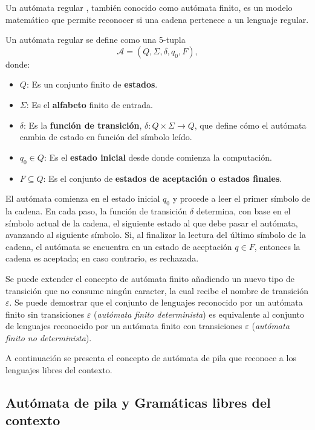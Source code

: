\documentclass[12pt]{article}
\begin{document}
Un autómata regular \cite{authomataTheory}, también conocido como autómata finito, es un modelo matemático que 
permite reconocer si una cadena pertenece a un lenguaje regular. 

Un autómata regular se define como una 5-tupla $$\mathcal{A} = (Q, \Sigma, \delta, q_0, F),$$ donde:

\begin{itemize}
      \item $Q$: Es un conjunto finito de \textbf{estados}.
      \item $\Sigma$: Es el \textbf{alfabeto} finito de entrada.
      \item $\delta$: Es la \textbf{función de transición}, $\delta: Q \times \Sigma \to Q$, que define cómo el autómata cambia de estado en función del símbolo leído.
      \item $q_0 \in Q$: Es el \textbf{estado inicial} desde donde comienza la computación.
      \item $F \subseteq Q$: Es el conjunto de \textbf{estados de aceptación o estados finales}.
\end{itemize}

El autómata comienza en el estado inicial $q_0$ y procede a leer el primer símbolo de la cadena.
En cada paso, la función de transición $\delta$ determina, con base en el símbolo actual de la cadena, el siguiente estado al que debe pasar el autómata, avanzando al siguiente símbolo.
Si, al finalizar la lectura del último símbolo de la cadena, el autómata se encuentra en un estado de aceptación $q \in F$, entonces la cadena es aceptada; en caso contrario, es rechazada.

Se puede extender el concepto de autómata finito añadiendo un nuevo tipo de transición que no consume ningún caracter, la cual recibe el nombre de transición $\varepsilon$. Se puede demostrar \cite{authomataTheory} que el conjunto de lenguajes reconocido por un autómata finito sin transiciones $\varepsilon$ (\textit{autómata finito determinista}) es equivalente al conjunto de lenguajes reconocido por un autómata finito con transiciones $\varepsilon$ (\textit{autómata finito no determinista}).

A continuación se presenta el concepto de autómata de pila que reconoce a los lenguajes libres del contexto.
\subsection{Autómata de pila y Gramáticas libres del contexto}
\end{document}
